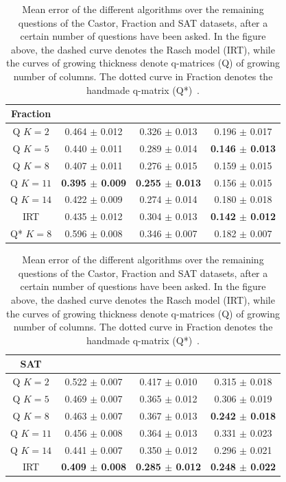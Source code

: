 \documentclass{edm_template}
\begin{document}
\begin{table}[h]
\begin{tabular}{@{}c|ccc@{}}
\textbf{Fraction}\\%
\hline
\textsf{Q} $K = 2$ & 0.464 $\pm$ 0.012 & 0.326 $\pm$ 0.013 & 0.196 $\pm$ 0.017 \\
\textsf{Q} $K = 5$ & 0.440 $\pm$ 0.011 & 0.289 $\pm$ 0.014 & \textbf{0.146 $\pm$ 0.013} \\
\textsf{Q} $K = 8$ & 0.407 $\pm$ 0.011 & 0.276 $\pm$ 0.015 & 0.159 $\pm$ 0.015 \\
\textsf{Q} $K = 11$ & \textbf{0.395 $\pm$ 0.009} & \textbf{0.255 $\pm$ 0.013} & 0.156 $\pm$ 0.015 \\
\textsf{Q} $K = 14$ & 0.422 $\pm$ 0.009 & 0.274 $\pm$ 0.014 & 0.180 $\pm$ 0.018 \\
\textsf{IRT} & 0.435 $\pm$ 0.012 & 0.304 $\pm$ 0.013 & \textbf{0.142 $\pm$ 0.012} \\
\textsf{Q*} $K = 8$ & 0.596 $\pm$ 0.008 & 0.346 $\pm$ 0.007 & 0.182 $\pm$ 0.007 \\
\end{tabular}

\begin{tabular}{@{}c|ccc@{}}
\textbf{SAT}\\%
\hline
\textsf{Q} $K = 2$ & 0.522 $\pm$ 0.007 & 0.417 $\pm$ 0.010 & 0.315 $\pm$ 0.018 \\
\textsf{Q} $K = 5$ & 0.469 $\pm$ 0.007 & 0.365 $\pm$ 0.012 & 0.306 $\pm$ 0.019 \\
\textsf{Q} $K = 8$ & 0.463 $\pm$ 0.007 & 0.367 $\pm$ 0.013 & \textbf{0.242 $\pm$ 0.018} \\
\textsf{Q} $K = 11$ & 0.456 $\pm$ 0.008 & 0.364 $\pm$ 0.013 & 0.331 $\pm$ 0.023 \\
\textsf{Q} $K = 14$ & 0.441 $\pm$ 0.007 & 0.350 $\pm$ 0.012 & 0.296 $\pm$ 0.021 \\
\textsf{IRT} & \textbf{0.409 $\pm$ 0.008} & \textbf{0.285 $\pm$ 0.012} & \textbf{0.248 $\pm$ 0.022} \\
\end{tabular}
\caption{Mean error of the different algorithms over the remaining questions of the Castor, Fraction and SAT datasets, after a certain number of questions have been asked. In the figure above, the dashed curve denotes the Rasch model (\textsf{IRT}), while the curves of growing thickness denote q-matrices (\textsf{Q}) of growing number of columns. The dotted curve in Fraction denotes the handmade q-matrix (\textsf{Q*})~\cite{DeCarlo2010}.}\vspace*{-5mm}
\label{tab:castor}
\end{table}
\end{document}
